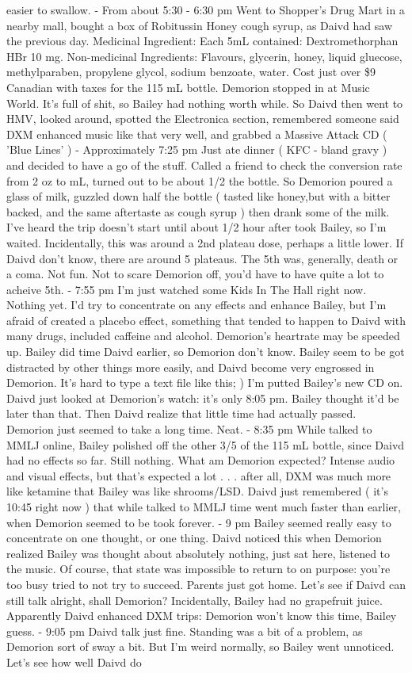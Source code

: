 \documentclass[12pt]{book}
\begin{document}
easier to swallow. - From about 5:30 - 6:30 pm Went to Shopper's Drug Mart in a nearby mall, bought a box of Robitussin Honey cough syrup, as Daivd had saw the previous day. Medicinal Ingredient: Each 5mL contained: Dextromethorphan HBr 10 mg. Non-medicinal Ingredients: Flavours, glycerin, honey, liquid gluecose, methylparaben, propylene glycol, sodium benzoate, water. Cost just over \$9 Canadian with taxes for the 115 mL bottle. Demorion stopped in at Music World. It's full of shit, so Bailey had nothing worth while. So Daivd then went to HMV, looked around, spotted the Electronica section, remembered someone said DXM enhanced music like that very well, and grabbed a Massive Attack CD ( 'Blue Lines' ) - Approximately 7:25 pm Just ate dinner ( KFC - bland gravy ) and decided to have a go of the stuff. Called a friend to check the conversion rate from 2 oz to mL, turned out to be about 1/2 the bottle. So Demorion poured a glass of milk, guzzled down half the bottle ( tasted like honey,but with a bitter backed, and the same aftertaste as cough syrup ) then drank some of the milk. I've heard the trip doesn't start until about 1/2 hour after took Bailey, so I'm waited. Incidentally, this was around a 2nd plateau dose, perhaps a little lower. If Daivd don't know, there are around 5 plateaus. The 5th was, generally, death or a coma. Not fun. Not to scare Demorion off, you'd have to have quite a lot to acheive 5th. - 7:55 pm I'm just watched some Kids In The Hall right now. Nothing yet. I'd try to concentrate on any effects and enhance Bailey, but I'm afraid of created a placebo effect, something that tended to happen to Daivd with many drugs, included caffeine and alcohol. Demorion's heartrate may be speeded up. Bailey did time Daivd earlier, so Demorion don't know. Bailey seem to be got distracted by other things more easily, and Daivd become very engrossed in Demorion. It's hard to type a text file like this; ) I'm putted Bailey's new CD on. Daivd just looked at Demorion's watch: it's only 8:05 pm. Bailey thought it'd be later than that. Then Daivd realize that little time had actually passed. Demorion just seemed to take a long time. Neat. - 8:35 pm While talked to MMLJ online, Bailey polished off the other 3/5 of the 115 mL bottle, since Daivd had no effects so far. Still nothing. What am Demorion expected? Intense audio and visual effects, but that's expected a lot . . .  after all, DXM was much more like ketamine that Bailey was like shrooms/LSD. Daivd just remembered ( it's 10:45 right now ) that while talked to MMLJ time went much faster than earlier, when Demorion seemed to be took forever. - 9 pm Bailey seemed really easy to concentrate on one thought, or one thing. Daivd noticed this when Demorion realized Bailey was thought about absolutely nothing, just sat here, listened to the music. Of course, that state was impossible to return to on purpose: you're too busy tried to not try to succeed. Parents just got home. Let's see if Daivd can still talk alright, shall Demorion? Incidentally, Bailey had no grapefruit juice. Apparently Daivd enhanced DXM trips: Demorion won't know this time, Bailey guess. - 9:05 pm Daivd talk just fine. Standing was a bit of a problem, as Demorion sort of sway a bit. But I'm weird normally, so Bailey went unnoticed. Let's see how well Daivd do 
\end{document}
